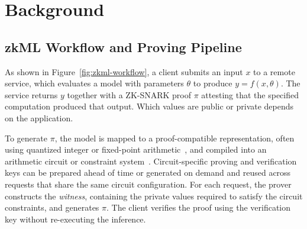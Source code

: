 \section{Background}
\label{sec:background}

\subsection{zkML Workflow and Proving Pipeline}
\label{sec:zkml-pipeline}

As shown in Figure~\ref{fig:zkml-workflow}, a client submits an input \(x\) to a remote service, which evaluates a model with parameters \(\theta\) to produce \(y=f(x,\theta)\). The service returns \(y\) together with a ZK-SNARK proof \(\pi\) attesting that the specified computation produced that output. Which values are public or private depends on the application.

To generate \(\pi\), the model is mapped to a proof-compatible representation, often using quantized integer or fixed-point arithmetic~\cite{boyuan2021zen,chen2024zkml}, and compiled into an arithmetic circuit or constraint system~\cite{gabizon2019plonk}. Circuit-specific proving and verification keys can be prepared ahead of time or generated on demand and reused across requests that share the same circuit configuration. For each request, the prover constructs the \emph{witness}, containing the private values required to satisfy the circuit constraints, and generates \(\pi\). The client verifies the proof using the verification key without re-executing the inference.

